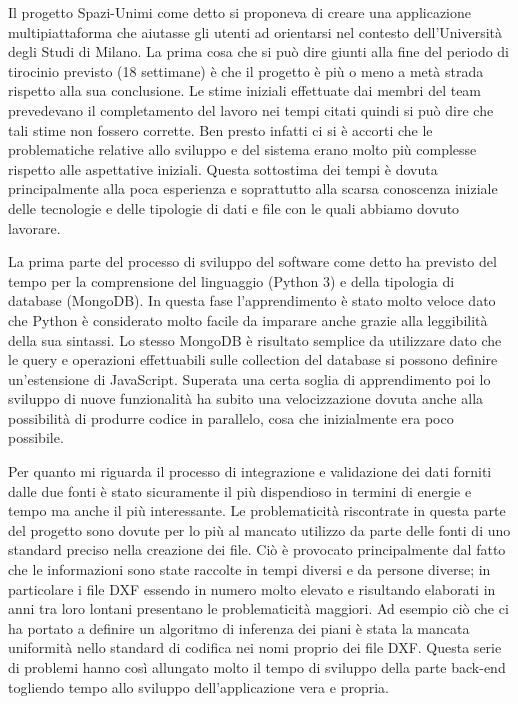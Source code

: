\documentclass[12pt]{report}
\begin{document}
Il progetto Spazi-Unimi come detto si proponeva di creare una applicazione multipiattaforma che aiutasse gli utenti ad orientarsi nel contesto dell'Università degli Studi di Milano.
La prima cosa che si può dire giunti alla fine del periodo di tirocinio previsto (18 settimane) è che il progetto è più o meno a metà strada rispetto alla sua conclusione.
Le stime iniziali effettuate dai membri del team prevedevano il completamento del lavoro nei tempi citati quindi si può dire che tali stime non fossero corrette. 
Ben presto infatti ci si è accorti che le problematiche relative allo sviluppo e del sistema erano molto più complesse rispetto alle aspettative iniziali.
Questa sottostima dei tempi è dovuta principalmente alla poca esperienza e soprattutto alla scarsa conoscenza iniziale delle tecnologie e delle tipologie di dati e file con le quali abbiamo dovuto lavorare.

\vspace{5mm} %

La prima parte del processo di sviluppo del software come detto ha previsto del tempo per la comprensione del linguaggio (Python 3) e della tipologia di database (MongoDB).
In questa fase l'apprendimento è stato molto veloce dato che Python è considerato molto facile da imparare anche grazie alla leggibilità della sua sintassi.
Lo stesso MongoDB è risultato semplice da utilizzare dato che le query e operazioni effettuabili sulle collection del database si possono definire un'estensione di JavaScript.
Superata una certa soglia di apprendimento poi lo sviluppo di nuove funzionalità ha subito una velocizzazione dovuta anche alla possibilità di produrre codice in parallelo, cosa che inizialmente era poco possibile.

\vspace{5mm} %

Per quanto mi riguarda il processo di integrazione e validazione dei dati forniti dalle due fonti è stato sicuramente il più dispendioso in termini di energie e tempo ma anche il più interessante.
Le problematicità riscontrate in questa parte del progetto sono dovute per lo più al mancato utilizzo da parte delle fonti di uno standard preciso nella creazione dei file.
Ciò è provocato principalmente dal fatto che le informazioni sono state raccolte in tempi diversi e da persone diverse; in particolare i file DXF essendo in numero molto elevato e risultando elaborati in anni tra loro lontani presentano le problematicità maggiori.  
Ad esempio ciò che ci ha portato a definire un algoritmo di inferenza dei piani è stata la mancata uniformità nello standard di codifica nei nomi proprio dei file DXF.
Questa serie di problemi hanno così allungato molto il tempo di sviluppo della parte back-end togliendo tempo allo sviluppo dell'applicazione vera e propria.
\end{document}
